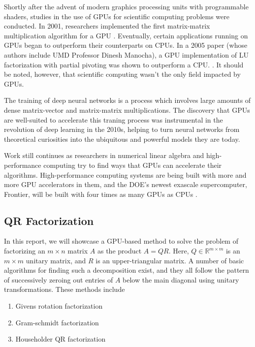 \documentclass[12pt]{article}
\begin{document}
Shortly after the advent of modern graphics processing units with programmable shaders, 
studies in the use of GPUs for scientific computing problems were conducted. In 2001, 
researchers implemented the first matrix-matrix multiplication algorithm for a GPU 
\cite{10.1145/582034.582089}. Eventually, certain applications running on GPUs began to 
outperform their counterparts on CPUs. In a 2005 paper (whose authors include UMD 
Professor Dinesh Manocha), a GPU implementation of LU factorization with partial 
pivoting was shown to outperform a CPU. \cite{1559955}. It should be noted, however, that 
scientific computing wasn't the only field impacted by GPUs.

The training of deep neural networks is a process which involves large amounts of dense
matrix-vector and matrix-matrix multiplications. The discovery that GPUs are well-suited 
to accelerate this traning process was instrumental in the revolution of deep learning 
in the 2010s, helping to turn neural networks from theoretical curiosities into the 
ubiquitous and powerful models they are today.

Work still continues as researchers in numerical linear algebra and high-performance 
computing try to find ways that GPUs can accelerate their algorithms. High-performance 
computing systems are being built with more and more GPU accelerators in them, 
and the DOE's newest exascale supercomputer, Frontier, will be built with four times 
as many GPUs as CPUs \cite{frontier}.

\subsection*{QR Factorization}

In this report, we will showcase a GPU-based method to solve the problem of factorizing 
an $m \times n$ matrix $A$ as the product $A = QR$. Here, $Q \in \mathbb{R}^{m \times m}$ 
is an $m \times m$ unitary matrix, and $R$ is an upper-triangular matrix. A number of basic
algorithms for finding such a decomposition exist, and they all follow the pattern of
successively zeroing out entries of $A$ below the main diagonal using unitary transformations.
These methods include

\begin{enumerate}
    \item Givens rotation factorization
    \item Gram-schmidt factorization
    \item Householder QR factorization
\end{enumerate}
\end{document}
